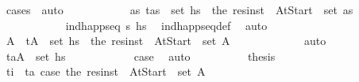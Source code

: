 \begin{isabellebody}
\ {\isacharparenleft}{\kern0pt}cases\ {\isasympi}{\isacharparenright}{\kern0pt}\ auto\isanewline
\ \ \ \ \ \ \ \ \isamarkupfalse%
\ \isamarkupfalse%
\ {\isachardoublequoteopen}{\isasymexists}as{\isachardot}{\kern0pt}\ {\isacharparenleft}{\kern0pt}t\isactrlsub {\isasympi}{\isacharcomma}{\kern0pt}as{\isacharparenright}{\kern0pt}\ {\isasymin}\ set\ hs\ {\isasymand}\ the\ {\isacharparenleft}{\kern0pt}res{\isacharunderscore}{\kern0pt}inst\ {\isasympi}\ At{\isacharunderscore}{\kern0pt}Start{\isacharparenright}{\kern0pt}\ {\isasymin}\ set\ as{\isachardoublequoteclose}\isanewline
\ \ \ \ \ \ \ \ \ \ \isamarkupfalse%
\ {\isacartoucheopen}ind{\isacharunderscore}{\kern0pt}happ{\isacharunderscore}{\kern0pt}seq\ {\isasympi}s\ hs\ \isamarkupfalse%
\ ind{\isacharunderscore}{\kern0pt}happ{\isacharunderscore}{\kern0pt}seq{\isacharunderscore}{\kern0pt}def\ \isamarkupfalse%
\ auto\isanewline
\ \ \ \ \ \ \ \ \isamarkupfalse%
\ \isamarkupfalse%
\ A{\isacharprime}{\kern0pt}\ \ {\isachardoublequoteopen}{\isacharparenleft}{\kern0pt}t\isactrlsub {\isasympi}{\isacharcomma}{\kern0pt}A{\isacharprime}{\kern0pt}{\isacharparenright}{\kern0pt}\ {\isasymin}\ set\ hs\ \ {\isachardoublequoteopen}the\ {\isacharparenleft}{\kern0pt}res{\isacharunderscore}{\kern0pt}inst\ {\isasympi}\ At{\isacharunderscore}{\kern0pt}Start{\isacharparenright}{\kern0pt}\ {\isasymin}\ set\ A{\isacharprime}{\kern0pt}{\isachardoublequoteclose}\ \isanewline
\ \ \ \ \ \ \ \ \ \ \isamarkupfalse%
\ auto\isanewline
\ \ \ \ \ \ \ \ \isamarkupfalse%
\ \isamarkupfalse%
\ {\isachardoublequoteopen}{\isacharparenleft}{\kern0pt}t\isactrlsub a{\isacharcomma}{\kern0pt}A{\isacharprime}{\kern0pt}{\isacharparenright}{\kern0pt}\ {\isasymin}\ set\ hs\isanewline
\ \ \ \ \ \ \ \ \ \ \isamarkupfalse%
\ {\isacartoucheopen}{\isacharquery}{\kern0pt}case{}{\isacartoucheclose}\ \isamarkupfalse%
\ auto\isanewline
\ \ \ \ \ \ \ \ \isamarkupfalse%
\ {\isacharquery}{\kern0pt}thesis\isanewline
\ \ \ \ \ \ \ \ \ \ \isamarkupfalse%
\ {\isacartoucheopen}t\isactrlsub i\ {\isacharequal}{\kern0pt}\ t\isactrlsub a{\isacartoucheclose}\ {\isacartoucheopen}{\isacharquery}{\kern0pt}case{}{\isacartoucheclose}\ {\isacartoucheopen}the\ {\isacharparenleft}{\kern0pt}res{\isacharunderscore}{\kern0pt}inst\ {\isasympi}\ At{\isacharunderscore}{\kern0pt}Start{\isacharparenright}{\kern0pt}\ {\isasymin}\ set\ A{\isacharprime}{\kern0pt}{\isacartoucheclose}\isanewline

\end{isabellebody}
